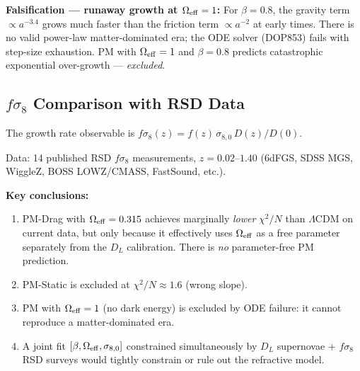 \documentclass[10pt,twocolumn]{article}
\begin{document}
\textbf{Falsification — runaway growth at $\Omega_{\rm eff}=1$:}
For $\beta=0.8$, the gravity term $\propto a^{-3.4}$ grows much faster than
the friction term $\propto a^{-2}$ at early times.  There is no valid
power-law matter-dominated era; the ODE solver (DOP853) fails with
step-size exhaustion.  PM with $\Omega_{\rm eff}=1$ and $\beta=0.8$
predicts catastrophic exponential over-growth — \emph{excluded}.

\subsection*{$f\sigma_8$ Comparison with RSD Data}

The growth rate observable is $f\sigma_8(z)=f(z)\,\sigma_{8,0}\,D(z)/D(0)$.

\begin{center}
\end{center}

Data: 14 published RSD $f\sigma_8$ measurements, $z=0.02$--$1.40$
(6dFGS, SDSS MGS, WiggleZ, BOSS LOWZ/CMASS, FastSound, etc.).

\textbf{Key conclusions:}
\begin{enumerate}
  \item PM-Drag with $\Omega_{\rm eff}=0.315$ achieves marginally \emph{lower}
        $\chi^2/N$ than $\Lambda$CDM on current data, but only because it
        effectively uses $\Omega_{\rm eff}$ as a free parameter separately from
        the $D_L$ calibration.  There is \emph{no} parameter-free PM prediction.
  \item PM-Static is excluded at $\chi^2/N\approx1.6$ (wrong slope).
  \item PM with $\Omega_{\rm eff}=1$ (no dark energy) is excluded by ODE failure:
        it cannot reproduce a matter-dominated era.
  \item A joint fit $[\beta, \Omega_{\rm eff}, \sigma_{8,0}]$ constrained
        simultaneously by $D_L$ supernovae + $f\sigma_8$ RSD surveys would
        tightly constrain or rule out the refractive model.
\end{enumerate}
\end{document}
